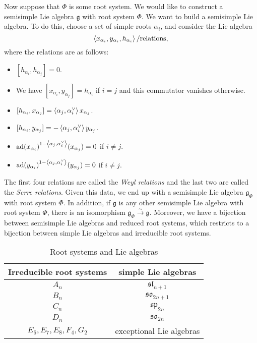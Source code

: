 \documentclass[leqno, openany]{memoir}
\theoremstyle{definition}
\theoremstyle{remark}
\theoremstyle{plain}
\theoremstyle{definition}
\theoremstyle{remark}
\newcommand{\mf}[1]{\mathfrak{#1}}
\DeclareMathOperator{\ad}{ad}
\begin{document}
Now suppose that $\Phi$ is some root system. We would like to construct a semisimple Lie algebra $\mf{g}$ with root system $\Phi$. We want to build a semisimple Lie algebra. To do this, choose a set of simple roots $\alpha_i$, and consider the Lie algebra
\[ \ev{x_{\alpha_i}, y_{\alpha_i}, h_{\alpha_i}} / \text{relations}, \]
where the relations are as follows:
\begin{itemize}
    \item $[h_{\alpha_i}, h_{\alpha_j}] = 0$.
    \item We have $[x_{\alpha_i}, y_{\alpha_j}] = h_{\alpha_i}$ if $i = j$ and this commutator vanishes otherwise.
    \item $[h_{\alpha_i}, x_{\alpha_j}] = \ev{\alpha_j, \alpha_i^{\vee}} x_{\alpha_j}$.
    \item $[h_{\alpha_i}, y_{\alpha_j}] = - \ev{\alpha_j, \alpha_i^{\vee}} y_{\alpha_j}$.
    \item ${\ad(x_{\alpha_i})}^{1-\ev{\alpha_j, \alpha_i^{\vee}}}(x_{\alpha_j}) = 0$ if $i \neq j$.
    \item ${\ad(y_{\alpha_i})}^{1-\ev{\alpha_j, \alpha_i^{\vee}}}(y_{\alpha_j}) = 0$ if $i \neq j$.
\end{itemize}
The first four relations are called the \textit{Weyl relations} and the last two are called the \textit{Serre relations}. Given this data, we end up with a semisimple Lie algebra $\mf{g}_{\Phi}$ with root system $\Phi$. In addition, if $\mf{g}$ is any other semisimple Lie algebra with root system $\Phi$, there is an isomorphism $\mf{g}_{\Phi} \xrightarrow{\sim} \mf{g}$. Moreover, we have a bijection between semisimple Lie algebras and reduced root systems, which restricts to a bijection between simple Lie algebras and irreducible root systems.

\begin{table}[H]
    \centering
    \caption{Root systems and Lie algebras}
    \label{tab:classification}
    \begin{tabular}{cc}
    \toprule
    Irreducible root systems & simple Lie algebras \\
    \midrule
    $A_n$ & $\mf{sl}_{n+1}$ \\
    $B_n$ & $\mf{so}_{2n+1}$ \\
    $C_n$ & $\mf{sp}_{2n}$ \\
    $D_n$ & $\mf{so}_{2n}$ \\
    $E_6, E_7, E_8, F_4, G_2$ & exceptional Lie algebras \\
    \bottomrule
    \end{tabular}
\end{table}
\end{document}
